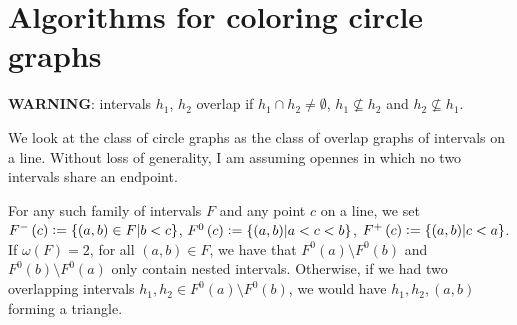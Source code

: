 \documentclass[12pt]{article}
\theoremstyle{definition}
\newcommand{\defeq}{\vcentcolon=}
\begin{document}
    \section{Algorithms for coloring circle graphs}
    
    \textbf{WARNING}: intervals
    $h_1$, $h_2$ overlap if
    $h_1 \cap h_2 \neq \emptyset$,
    $h_1 \not \subseteq h_2$ and
    $h_2 \not \subseteq h_1$.
    \vspace{4pt}

    We look at the class
    of circle graphs as the class
    of overlap graphs of intervals on a line.
    Without loss of generality,
    {I am assuming opennes}
    in which no two intervals
    share an endpoint.

    For any such family of intervals
    $F$ and any point $c$ on a line,
    we set $F^{-}\left(c\right) \defeq
    \left\{\left(a, b\right) \in F
    \middle| b < c\right\}$,
    $F^{0}\left(c\right) \defeq
    \left\{\left(a, b\right)
    \middle| a < c < b\right\}$,
    $F^{+}\left(c\right) \defeq
    \left\{\left(a, b\right)
    \middle| c < a\right\}$.
    If $\omega\left(F\right) = 2$,
    for all $\left(a, b\right) \in F$,
    we have that
    $F^{0}\left(a\right) \setminus F^{0}\left(b\right)$ 
    and $F^{0}\left(b\right) \setminus F^{0}\left(a\right)$
    only contain nested intervals.
    Otherwise, if we had two
    overlapping intervals $h_1, h_2 \in
    F^{0}\left(a\right) \setminus F^{0}\left(b\right)$,
    we would have $h_1, h_2, \left(a, b\right)$ 
    forming a triangle.
\end{document}

